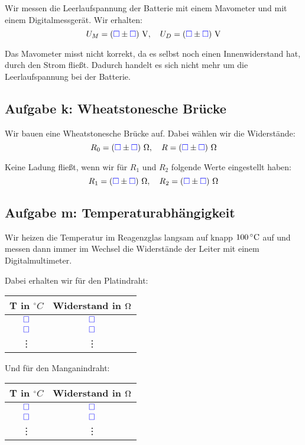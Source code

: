 \documentclass[11pt, ngerman]{article}
\newcommand{\messwert}{\textcolor{blue}{\square}}
\newcommand{\emesswert}{\left(\messwert \pm \messwert \right)}
\begin{document}
\label{durchführung-j}

Wir messen die Leerlaufspannung der Batterie mit einem Mavometer und mit einem
Digitalmessgerät. Wir erhalten:
\[ U_M = \unit[\emesswert] V, \quad U_D = \unit[\emesswert] V \]

Das Mavometer misst nicht korrekt, da es selbst noch einen Innenwiderstand hat,
durch den Strom fließt. Dadurch handelt es sich nicht mehr um die
Leerlaufspannung bei der Batterie.

\subsection{Aufgabe k: Wheatstonesche Brücke}

\label{durchführung-k}

Wir bauen eine Wheatstonesche Brücke auf. Dabei wählen wir die Widerstände:
\[
	R_0 = \unit[\emesswert] \Omega,
	\quad
	R = \unit[\emesswert] \Omega
\]

Keine Ladung fließt, wenn wir für $R_1$ und $R_2$ folgende Werte eingestellt haben:
\[
	R_1 = \unit[\emesswert] \Omega,
	\quad
	R_2 = \unit[\emesswert] \Omega
\]

\subsection{Aufgabe m: Temperaturabhängigkeit}

\label{durchführung-m}

Wir heizen die Temperatur im Reagenzglas langsam auf knapp $\unit[100]{^\circ C}$ auf und messen dann immer im Wechsel die Widerstände der Leiter mit einem Digitalmultimeter.

Dabei erhalten wir für den Platindraht:

\begin{center}
	\begin{tabular}{cc}
		T in $\unit{^\circ C}$ & Widerstand in $\unit \Omega$ \\
		\hline
		$\messwert$ & $\messwert$ \\
		$\messwert$ & $\messwert$ \\
		   \vdots & \vdots
	\end{tabular}
\end{center}

Und für den Manganindraht:

\begin{center}
	\begin{tabular}{cc}
		T in $\unit{^\circ C}$ & Widerstand in $\unit \Omega$ \\
		\hline
		$\messwert$ & $\messwert$ \\
		$\messwert$ & $\messwert$ \\
		   \vdots & \vdots
	\end{tabular}
\end{center}
\end{document}
